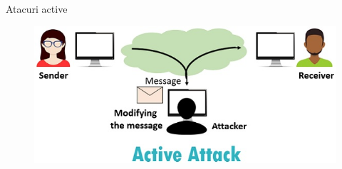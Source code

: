 \documentclass[pdf]{beamer}
\begin{document}
\begin{frame}{Atacuri active}
\begin{figure}[t]
\centering
\includegraphics[scale=0.75]{Images/active-attack-modified}
\end{figure}
\end{frame}
\end{document}
